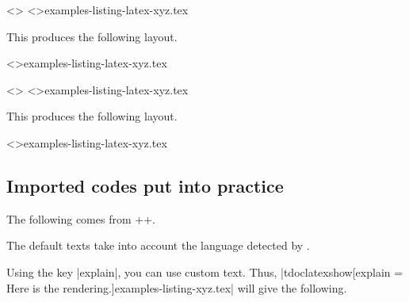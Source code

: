 

\begin{tdocexa}
    \leavevmode

    \begin{tdoclatex}<>
\tdoclatexinput<>{examples-listing-latex-xyz.tex}
    \end{tdoclatex}

    This produces the following layout.

    \tdoclatexinput<>{examples-listing-latex-xyz.tex}
\end{tdocexa}


\begin{tdocexa}[Customise]
    \leavevmode

    \begin{tdoclatex}<>
\tdoclatexinput[style=igor, showspaces]<>{examples-listing-latex-xyz.tex}
    \end{tdoclatex}

    This produces the following layout.

	\tdoclatexinput[style = igor, showspaces]<>{examples-listing-latex-xyz.tex}
\end{tdocexa}




\subsection{Imported codes put into practice}
\label{tutodoc-listing-latexshow}

\begin{tdocexa}[Showcase]
    The following comes from \tdoclatexin++.

    \smallskip

\end{tdocexa}


\begin{tdocnote}
    The default texts take into account the language detected by \thisproj.
\end{tdocnote}




\begin{tdocexa}
    Using the key \tdoclatexin|explain|, you can use custom text. Thus, \tdoclatexin|tdoclatexshow[explain = Here is the rendering.]{examples-listing-xyz.tex}| will give the following.

    \smallskip

\end{tdocexa}


